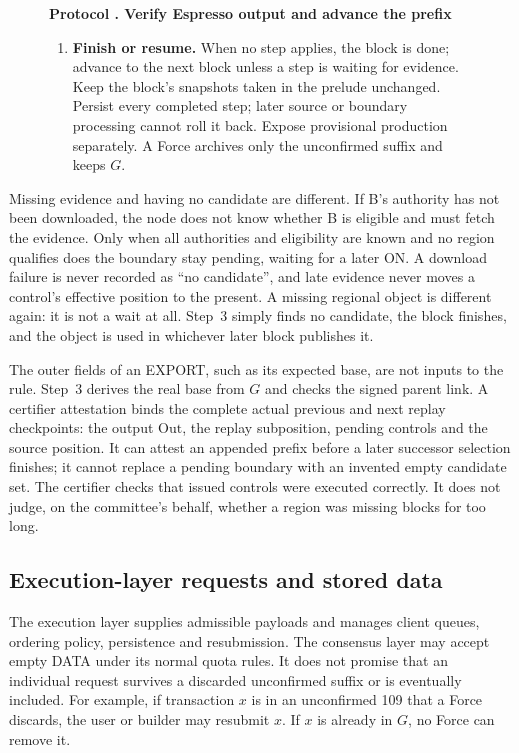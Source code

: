 \documentclass[11pt,a4paper]{article}
\newcounter{protocol}
\newenvironment{protocol}[3][htbp]{\begin{figure}[#1]\refstepcounter{protocol}\label{#2}
\begin{mdframed}[linewidth=.6pt,skipabove=0pt,skipbelow=0pt,
innertopmargin=7pt,innerbottommargin=7pt]\small
\textbf{Protocol \theprotocol. #3}\par\smallskip}{\end{mdframed}\end{figure}}
\begin{document}
\begin{protocol}{alg:external}{Verify Espresso output and advance the prefix}
\begin{enumerate}[label=\textbf{\arabic*)},itemsep=3pt]
\item \textbf{Finish or resume.} When no step applies, the block is
done; advance to the next block unless a step is waiting for evidence.
Keep the block's snapshots taken in the prelude unchanged. Persist every
completed step; later source or boundary processing cannot roll it back.
Expose provisional production separately. A Force archives only the
unconfirmed suffix and keeps $G$.
\end{enumerate}
\end{protocol}

Missing evidence and having no candidate are different. If B's authority
has not been downloaded, the node does not know whether B is eligible and
must fetch the evidence. Only when all authorities and eligibility are
known and no region qualifies does the boundary stay pending, waiting
for a later ON. A download failure is never recorded as ``no candidate'',
and late evidence never moves a control's effective position to the
present. A missing regional object is different again: it is not a wait
at all. Step~3 simply finds no candidate, the block finishes, and the
object is used in whichever later block publishes it.

The outer fields of an EXPORT, such as its expected base, are not inputs
to the rule. Step~3 derives the real base from $G$ and checks the signed
parent link. A certifier attestation binds the complete actual previous
and next replay checkpoints: the output $\mathrm{Out}$, the replay
subposition, pending controls and the source position. It can attest an
appended prefix before a later successor selection finishes; it cannot
replace a pending boundary with an invented empty candidate set. The certifier
checks that issued controls were executed correctly. It does not judge,
on the committee's behalf, whether a region was missing blocks for too
long.

\subsection{Execution-layer requests and stored data}
\label{sec:requests}
The execution layer supplies admissible payloads and manages client
queues, ordering policy, persistence and resubmission. The consensus
layer may accept empty DATA under its normal quota rules. It does not
promise that an individual request survives a discarded unconfirmed
suffix or is eventually included. For example, if transaction $x$ is in
an unconfirmed 109 that a Force discards, the user or builder may
resubmit $x$. If $x$ is already in $G$, no Force can remove it.
\end{document}
